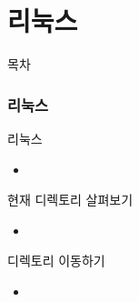\documentclass[aspectratio=1610,20pt,xcolor=pdftex,dvipsnames,table,handout]{beamer}
\begin{document}
		\part{리눅스 }
		\frame{\partpage}

\label{part3} 	%


		\begin{frame} [plain]{목차}
		\tableofcontents%
		\end{frame}
		



		\section{리눅스}


		\begin{frame} [t,plain]

			\begin{block} {리눅스}
			\setlength{\leftmargini}{2em}			
			\begin{itemize}
				\item 
			\end{itemize}
			\end{block}						

		\end{frame}						


		\begin{frame} [t,plain]



			\begin{block} {현재 디렉토리 살펴보기}
			\setlength{\leftmargini}{2em}			
			\begin{itemize}
				\item 
			\end{itemize}
			\end{block}						

		\end{frame}			

		\begin{frame} [t,plain]

			\begin{block} {디렉토리 이동하기}
			\setlength{\leftmargini}{2em}			
			\begin{itemize}
				\item 
			\end{itemize}
			\end{block}						

		\end{frame}			
\end{document}
